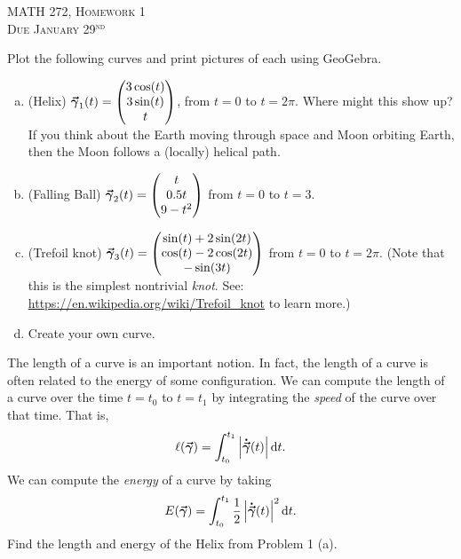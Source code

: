 \documentclass[12pt]{article} %
\begin{document}
\begin{center}
   \textsc{\large MATH 272, Homework 1}\\
   \textsc{Due January 29$^\textrm{nd}$}
\end{center}
\vspace{.5cm}

\begin{problem}
Plot the following curves and print pictures of each using GeoGebra.  
\begin{enumerate}[(a)]
	\item (Helix) $\boldsymbol{\vec{\gamma}}_1(t) = \begin{pmatrix} 3\cos(t) \\ 3\sin(t) \\ t\end{pmatrix}$, from $t=0$ to $t=2\pi$. Where might this show up? If you think about the Earth moving through space and Moon orbiting Earth, then the Moon follows a (locally) helical path.
	
	\item (Falling Ball) $\boldsymbol{\vec{\gamma}}_2(t) = \begin{pmatrix} t\\  0.5t \\ 9-t^2 \end{pmatrix}$ from $t=0$ to $t=3$.
	
	\item (Trefoil knot) $\boldsymbol{\vec{\gamma}}_3(t) = \begin{pmatrix} \sin(t)+2\sin(2t) \\ \cos(t)-2\cos(2t) \\ -\sin(3t) \end{pmatrix}$ from $t=0$ to $t=2\pi$. (Note that this is the simplest nontrivial \emph{knot}. See: \url{https://en.wikipedia.org/wiki/Trefoil_knot} to learn more.)
	
	\item Create your own curve.
\end{enumerate}
\end{problem}

\begin{problem}
The length of a curve is an important notion. In fact, the length of a curve is often related to the energy of some configuration. We can compute the length of a curve over the time $t=t_0$ to $t=t_1$ by integrating the \emph{speed} of the curve over that time.  That is,
\[
\ell(\boldsymbol{\vec{\gamma}}) = \int_{t_0}^{t_1} \left|\boldsymbol{\dot{\vec{\gamma}}}(t)\right| \mathop{}\!\mathrm{d} t.
\]
We can compute the \emph{energy} of a curve by taking
\[
E(\boldsymbol{\vec{\gamma}}) = \int_{t_0}^{t_1} \frac{1}{2} \left| \boldsymbol{\dot{\vec{\gamma}}}(t)\right|^2 \mathop{}\!\mathrm{d} t.
\]
Find the length and energy of the Helix from Problem 1 (a).
\end{problem}
\end{document}

